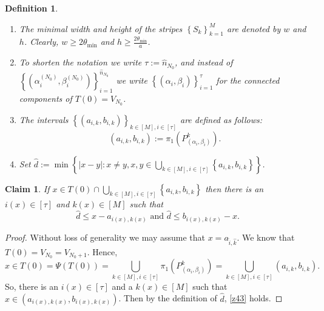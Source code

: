 \documentclass[amssymb,amsfonts,12pt,verbatim,righttag,oneside]{amsart}
\numberwithin{equation}{section} %
\theoremstyle{plain}
\theoremstyle{plain}
\newtheorem{claim}[theorem]{Claim}
\newtheorem{definition}[theorem]{Definition}
\begin{document}
\begin{definition}\label{z45}
\begin{enumerate}
[{\bf (a)}]
\item The minimal width and height of the stripes $\left\{ S_k \right\}_{k=1}^{M }$ are denoted by $w$ and $h$. Clearly, $w\geq 2\theta_{\min}$ and $h\geq \frac{2\theta_{\min}}{a}$.
\item  To shorten the notation we write $\tau:=\widehat{n}_{N_0}$, and instead of
$
\left\{ (\alpha _{i}^{ (N_0)},\beta _{i}^{(N_0) }) \right\} _{i=1 }^{\widehat{n}_{N_0} }
$
we write $\left\{ (\alpha _i,\beta _i) \right\}_{i=1}^{\tau }$ for the connected components of $T(0)=V_{N_0}$.
\item The intervals $\left\{ (a_{i,k},b_{i,k}) \right\}_{k\in[M], i
\in[\tau]}$ are defined as follows:
$$(a_{i,k},b_{i,k}):=\pi _1\left( P _{ (\alpha _i,\beta _i)}^{ k} \right).$$
\item Set $\widehat{d}:=\min \left\{ |x-y|:
x\ne y,
x,y\in\bigcup\limits_{k\in[M],i\in[\tau]} \left\{ a_{i,k},b_{i,k} \right\}
\right\}$.
\end{enumerate}
\end{definition}
\begin{claim}\label{z44}
  If $x\in T(0)\cap \bigcup\limits_{k\in[M],i\in[\tau]} \left\{ a_{i,k},b_{i,k} \right\}$ then
  there is an $i(x)\in[\tau]$ and $k(x)\in[M]$ such that
\begin{equation}
\label{z43}
\widehat{d}\leq
x-a_{i(x),k(x)}  \text{ and }
\widehat{d}\leq
b_{i(x),k(x)}-x.
\end{equation}

\end{claim}
\begin{proof}
  Without loss of generality we may assume that
$x=a_{\widehat{i},\widehat{k}}$.
  We know that
$T(0)=V_{N_0}=V_{N_0+1}$. Hence,
\begin{equation}
\label{y66}
x\in T(0)=\Psi(T(0)) =
\bigcup\limits_{k\in[M],i\in[\tau]}
\pi _1\left(
  P _{(\alpha _i,\beta _i)}^{k }
 \right)
 =
 \bigcup\limits_{k\in[M],i\in[\tau]}
 (a_{i,k},b_{i,k}).
\end{equation}
So, there is an $i(x)\in[\tau]$ and a $k(x)\in[M]$ such that
$x\in (a_{i(x),k(x)},b_{i(x),k(x)})$. Then by the definition of $\widehat{d}$,
\eqref{z43} holds.
\end{proof}
\end{document}
